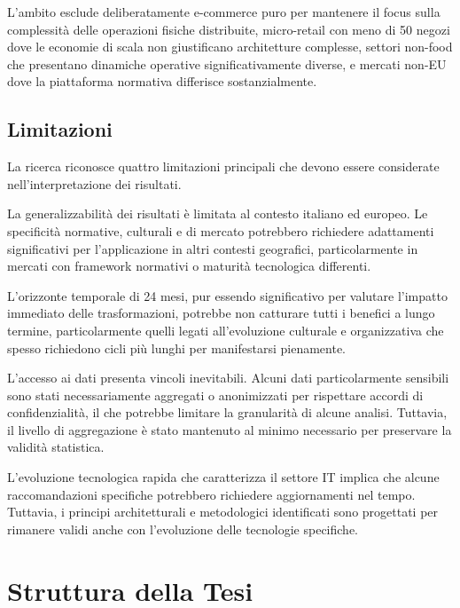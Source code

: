\documentclass[12pt,a4paper,oneside]{book}
\numberwithin{figure}{chapter} %
\numberwithin{table}{chapter}  %
\begin{document}
L'ambito esclude deliberatamente e-commerce puro per mantenere il focus sulla complessità delle operazioni fisiche distribuite, micro-retail con meno di 50 negozi dove le economie di scala non giustificano architetture complesse, settori non-food che presentano dinamiche operative significativamente diverse, e mercati non-EU dove la piattaforma normativa differisce sostanzialmente.

\subsection{\texorpdfstring{\textbf{
Limitazioni}}{1.6.2 Limitazioni}}\label{limitazioni}

La ricerca riconosce quattro limitazioni principali che devono essere
considerate nell'interpretazione dei risultati.

La generalizzabilità dei risultati è limitata al contesto italiano ed
europeo. Le specificità normative, culturali e di mercato potrebbero
richiedere adattamenti significativi per l'applicazione in altri
contesti geografici, particolarmente in mercati con framework normativi o maturità tecnologica differenti.

L'orizzonte temporale di 24 mesi, pur essendo significativo per valutare
l'impatto immediato delle trasformazioni, potrebbe non catturare tutti i
benefici a lungo termine, particolarmente quelli legati all'evoluzione
culturale e organizzativa che spesso richiedono cicli più lunghi per
manifestarsi pienamente.

L'accesso ai dati presenta vincoli inevitabili. Alcuni dati
particolarmente sensibili sono stati necessariamente aggregati o
anonimizzati per rispettare accordi di confidenzialità, il che potrebbe
limitare la granularità di alcune analisi. Tuttavia, il livello di
aggregazione è stato mantenuto al minimo necessario per preservare la
validità statistica.

L'evoluzione tecnologica rapida che caratterizza il settore IT implica
che alcune raccomandazioni specifiche potrebbero richiedere
aggiornamenti nel tempo. Tuttavia, i principi architetturali e
metodologici identificati sono progettati per rimanere validi anche con
l'evoluzione delle tecnologie specifiche.

\section{\texorpdfstring{\textbf{Struttura della
Tesi}}{1.7 Struttura della Tesi}}\label{struttura-della-tesi}
\end{document}
